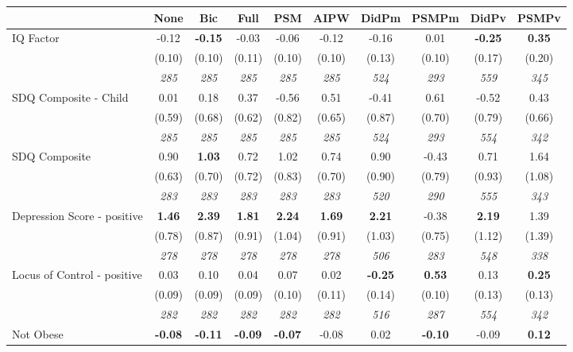 \begin{tabular}{l c c c c c c c c c}
\toprule
 & None & Bic & Full & PSM & AIPW & DidPm & PSMPm & DidPv & PSMPv \\
\midrule
IQ Factor & -0.12 & \textbf{ -0.15 } & -0.03 & -0.06 & -0.12 & -0.16 & 0.01 & \textbf{ -0.25 } & \textbf{0.35} \\
& (0.10) & (0.10) & (0.11) & (0.10) & (0.10) & (0.13) & (0.10) & (0.17) & (0.20) \\
& \textit{ 285 } & \textit{ 285 } & \textit{ 285 } & \textit{ 285 } & \textit{ 285 } & \textit{ 524 } & \textit{ 293 } & \textit{ 559 } & \textit{ 345 } \\
SDQ Composite - Child & 0.01 & 0.18 & 0.37 & -0.56 & 0.51 & -0.41 & 0.61 & -0.52 & 0.43 \\
& (0.59) & (0.68) & (0.62) & (0.82) & (0.65) & (0.87) & (0.70) & (0.79) & (0.66) \\
& \textit{ 285 } & \textit{ 285 } & \textit{ 285 } & \textit{ 285 } & \textit{ 285 } & \textit{ 524 } & \textit{ 293 } & \textit{ 554 } & \textit{ 342 } \\
SDQ Composite & 0.90 & \textbf{ 1.03 } & 0.72 & 1.02 & 0.74 & 0.90 & -0.43 & 0.71 & 1.64 \\
& (0.63) & (0.70) & (0.72) & (0.83) & (0.70) & (0.90) & (0.79) & (0.93) & (1.08) \\
& \textit{ 283 } & \textit{ 283 } & \textit{ 283 } & \textit{ 283 } & \textit{ 283 } & \textit{ 520 } & \textit{ 290 } & \textit{ 555 } & \textit{ 343 } \\
Depression Score - positive & \textbf{ 1.46 } & \textbf{ 2.39 } & \textbf{ 1.81 } & \textbf{2.24} & \textbf{1.69} & \textbf{ 2.21 } & -0.38 & \textbf{ 2.19 } & 1.39 \\
& (0.78) & (0.87) & (0.91) & (1.04) & (0.91) & (1.03) & (0.75) & (1.12) & (1.39) \\
& \textit{ 278 } & \textit{ 278 } & \textit{ 278 } & \textit{ 278 } & \textit{ 278 } & \textit{ 506 } & \textit{ 283 } & \textit{ 548 } & \textit{ 338 } \\
Locus of Control - positive & 0.03 & 0.10 & 0.04 & 0.07 & 0.02 & \textbf{ -0.25 } & \textbf{0.53} & 0.13 & \textbf{0.25} \\
& (0.09) & (0.09) & (0.09) & (0.10) & (0.11) & (0.14) & (0.10) & (0.13) & (0.13) \\
& \textit{ 282 } & \textit{ 282 } & \textit{ 282 } & \textit{ 282 } & \textit{ 282 } & \textit{ 516 } & \textit{ 287 } & \textit{ 554 } & \textit{ 342 } \\
Not Obese & \textbf{ -0.08 } & \textbf{ -0.11 } & \textbf{ -0.09 } & \textbf{-0.07} & -0.08 & 0.02 & \textbf{-0.10} & -0.09 & \textbf{0.12} \\

\end{tabular}
